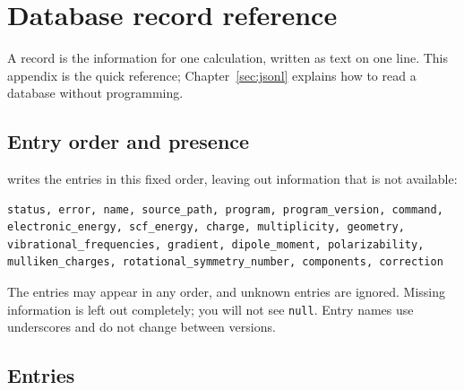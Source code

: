 \section{Database record reference}\label{app:record-reference}

A record is the information for one calculation, written as text on one line.
This appendix is the quick reference; Chapter~\ref{sec:jsonl} explains how to
read a database without programming.

\subsection{Entry order and presence}

\CJKQC{} writes the entries in this fixed order, leaving out information that
is not available:

\begin{verbatim}
status, error, name, source_path, program, program_version, command,
electronic_energy, scf_energy, charge, multiplicity, geometry,
vibrational_frequencies, gradient, dipole_moment, polarizability,
mulliken_charges, rotational_symmetry_number, components, correction
\end{verbatim}

The entries may appear in any order, and unknown entries are ignored. Missing
information is left out completely; you will not see \texttt{null}. Entry
names use underscores and do not change between versions.

\subsection{Entries}

